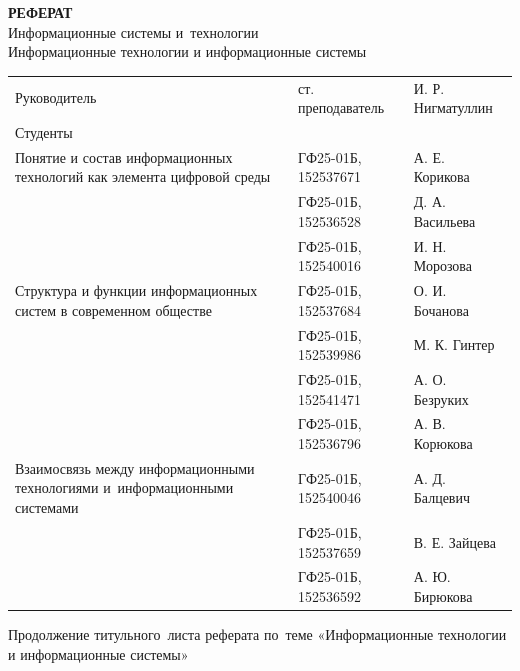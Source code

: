 \documentclass{ou}
\begin{document}
\thispagestyle{empty}
\begin{center}
\shortstack{\FGAVO}\vspace{4\baselineskip}
\textbf{РЕФЕРАТ}\\
Информационные системы и~технологии\\
Информационные технологии и информационные системы\vspace{2\baselineskip}\end{center}
\begin{flushleft}
\doublespacing
\begin{tabularx}{\textwidth}{@{} p{} l l @{}}
Руководитель & ст. преподаватель & И. Р. Нигматуллин\\
Студенты     &                   &                  \\
\multirow{-2.27}{\hsize}{\singlespacing Понятие и состав информационных технологий как элемента цифровой среды}
             & ГФ25-01Б, 152537671 & А. Е. Корикова\\
             & ГФ25-01Б, 152536528 & Д. А. Васильева\\
             & ГФ25-01Б, 152540016 & И. Н. Морозова\\
\multirow{-2.27}{\hsize}{\singlespacing Структура и функции информационных систем в современном обществе}
             & ГФ25-01Б, 152537684 & О. И. Бочанова\\
             & ГФ25-01Б, 152539986 & М. К. Гинтер\\
             & ГФ25-01Б, 152541471 & А. О. Безруких\\
             & ГФ25-01Б, 152536796 & А. В. Корюкова\\
\multirow{-2.27}{\hsize}{\singlespacing Взаимосвязь между информационными технологиями и~информационными системами}
             & ГФ25-01Б, 152540046 & А. Д. Балцевич\\
             & ГФ25-01Б, 152537659 & В. Е. Зайцева\\
             & ГФ25-01Б, 152536592 & А. Ю. Бирюкова\\
\end{tabularx}
\end{flushleft}
\vspace*{\fill}
\begin{center}
\city
\end{center}
\newpage
\thispagestyle{empty}
Продолжение титульного~листа реферата по~теме «Информационные технологии и информационные системы»
\end{document}
